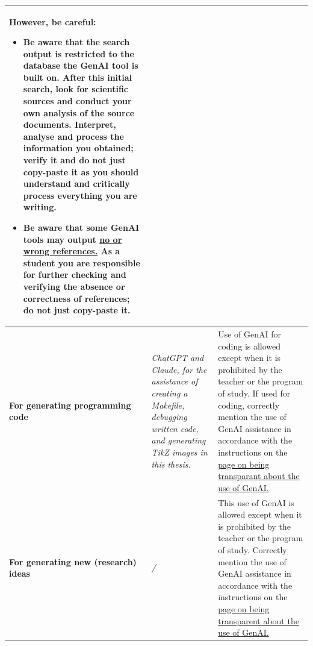 \begin{longtable}{|p{}|p{}|p{}|}
\medskip
\textbf{However, be careful:}
\begin{itemize}
    \item Be aware that the search output is restricted to the database the GenAI tool is built on. After this initial search, look for scientific sources and conduct your own analysis of the source documents. \textbf{Interpret, analyse and process the information you obtained; verify it and do not just copy-paste it} as you should understand and critically process everything you are writing.
    \item Be aware that some GenAI tools may \textbf{output \href{https://www.kuleuven.be/english/education/leuvenlearninglab/support/toolguide/guidelines-for-safe-use-of-genai-tools}{no or wrong references.}} As a student you are responsible for further checking and verifying the absence or correctness of references; do not just copy-paste it.
\end{itemize} \\ \hline
\textbf{For generating programming code } & \textit{ChatGPT and Claude, for the assistance of creating a Makefile, debugging written code, and generating TikZ images in this thesis.} & Use of GenAI for coding is allowed except when it is prohibited by the teacher or the program of study. If used for coding, correctly mention the use of GenAI assistance in accordance with the instructions on the \href{https://www.kuleuven.be/english/education/student/educational-tools/generative-artificial-intelligence#Transparency}{page on being transparant about the use of GenAI.} \\ \hline
\textbf{For generating new (research) ideas} & \textit{/} & This use of GenAI is allowed except when it is prohibited by the teacher or the program of study. Correctly mention the use of GenAI assistance in accordance with the instructions on the \href{https://www.kuleuven.be/english/education/student/educational-tools/generative-artificial-intelligence#Transparency}{page on being transparent about the use of GenAI.}


\end{longtable}

